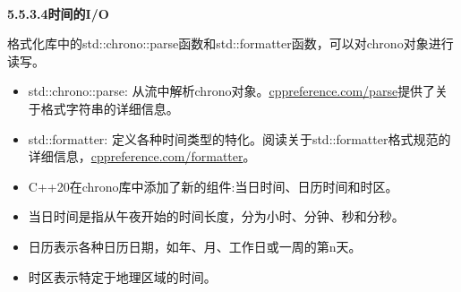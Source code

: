 \hspace*{\fill} \\ %
\noindent
\textbf{5.5.3.4\hspace{0.2cm}时间的I/O}

格式化库中的std::chrono::parse函数和std::formatter函数，可以对chrono对象进行读写。

\begin{itemize}
\item 
std::chrono::parse: 从流中解析chrono对象。\href{https://en.cppreference.com/w/cpp/chrono/parse}{cppreference.com/parse}提供了关于格式字符串的详细信息。

\item 
std::formatter: 定义各种时间类型的特化。阅读关于std::formatter格式规范的详细信息，\href{https://en.cppreference.com/w/cpp/chrono/system_clock/formatter#Format_specification}{cppreference.com/formatter}。
\end{itemize}

\begin{tcolorbox}[breakable,enhanced jigsaw,colback=mygreen!5!white,colframe=mygreen!75!black,title={总结}]

\begin{itemize}
\item 
C++20在chrono库中添加了新的组件:当日时间、日历时间和时区。

\item 
当日时间是指从午夜开始的时间长度，分为小时、分钟、秒和分秒。

\item 
日历表示各种日历日期，如年、月、工作日或一周的第n天。

\item 
时区表示特定于地理区域的时间。
\end{itemize}

\end{tcolorbox}

\newpage






